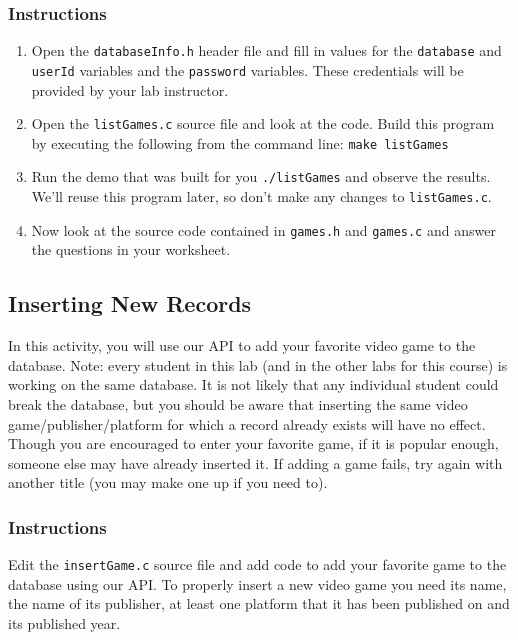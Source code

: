 \documentclass[12pt]{scrartcl}
\begin{document}
\subsubsection*{Instructions}

\begin{enumerate}
  \item Open the \texttt{databaseInfo.h} header file and fill in values
  	for the \texttt{database} and \texttt{userId} variables and
	the \texttt{password} variables.  These
	credentials will be provided by your lab instructor.
  \item Open the \texttt{listGames.c} source file and look 
	at the code.  Build this program by executing the following from the 
	command line: \texttt{make listGames}
  \item Run the demo that was built for you \texttt{./listGames} 
  	and observe the results.  We'll reuse this program later, so don't 
	make any changes to \texttt{listGames.c}.
  \item Now look at the source code contained in \texttt{games.h} 
	and \texttt{games.c} and answer the questions in your worksheet.
\end{enumerate}

\subsection{Inserting New Records}

In this activity, you will use our API to add your favorite video game to 
the database.  Note: every student in this lab (and in the other labs for 
this course) is working on the same database.  It is not likely that any 
individual student could break the database, but you should be aware 
that inserting the same video game/publisher/platform for which a 
record already exists will have no effect.  Though you are encouraged 
to enter your favorite game, if it is popular enough, someone else may 
have already inserted it.  If adding a game fails, try again with another 
title (you may make one up if you need to).

\subsubsection*{Instructions}

Edit the \texttt{insertGame.c} source file and add code to add 
your favorite game to the database using our API.  To properly insert 
a new video game you need its name, the name of its publisher, at 
least one platform that it has been published on and its published year.
\end{document}
